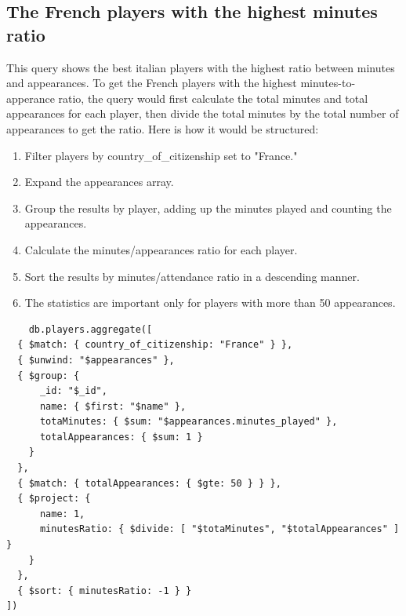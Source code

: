 \documentclass{Configuration_Files/PoliMi3i_thesis}
\begin{document}
\subsection{The French players with the highest minutes ratio}
This query shows the best italian players with the highest ratio between minutes and appearances.
To get the French players with the highest minutes-to-apperance ratio, the query would first calculate the total minutes and total appearances for each player, then divide the total minutes by the total number of appearances to get the ratio. Here is how it would be structured:
\begin{enumerate}
    \item Filter players by country\_of\_citizenship set to "France."
    \item Expand the appearances array.
    \item Group the results by player, adding up the minutes played and counting the appearances.
    \item Calculate the minutes/appearances ratio for each player.
    \item Sort the results by minutes/attendance ratio in a descending manner.
    \item The statistics are important only for players with more than 50 appearances.
\end{enumerate}
\begin{verbatim}
    db.players.aggregate([
  { $match: { country_of_citizenship: "France" } },
  { $unwind: "$appearances" },
  { $group: { 
      _id: "$_id", 
      name: { $first: "$name" }, 
      totaMinutes: { $sum: "$appearances.minutes_played" }, 
      totalAppearances: { $sum: 1 }
    } 
  },
  { $match: { totalAppearances: { $gte: 50 } } },
  { $project: { 
      name: 1, 
      minutesRatio: { $divide: [ "$totaMinutes", "$totalAppearances" ] }
    } 
  },
  { $sort: { minutesRatio: -1 } }
])
\end{verbatim}
\end{document}
